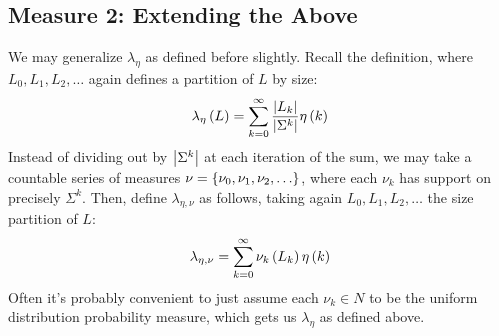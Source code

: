 \documentclass[12pt]{article}
\begin{document}
\subsection{Measure 2: Extending the Above}
We may generalize \(\lambda_{\eta}\) as defined before slightly.
Recall the definition, where
\(L_0, L_1, L_2, \ldots\) again defines a partition of \(L\) by size:
\begin{align*}
  \lambda_{\eta}\left(L\right)
    = \sum_{k = 0}^{\infty} \frac{\left\lvert L_k\right\rvert}{\left\lvert\Sigma^k\right\rvert} \eta\left(k\right)
\end{align*}
Instead of dividing out by \(\left\lvert\Sigma^k\right\rvert\) at each iteration of the sum,
we may take a countable series of measures
\(\nu = \left\{\nu_0, \nu_1, \nu_2, \ldots\right\}\),
where each \(\nu_k\) has support on precisely \(\Sigma^k\).
Then, define \(\lambda_{\eta, \nu}\) as follows,
taking again \(L_0, L_1, L_2, \ldots\) the size partition of \(L\):
\begin{align*}
  \lambda_{\eta, \nu}
    = \sum_{k = 0}^{\infty} \nu_k \left(L_k\right) \eta\left(k\right)
\end{align*}
Often it's probably convenient to just assume each \(\nu_k \in N\)
to be the uniform distribution probability measure,
which gets us \(\lambda_{\eta}\) as defined above.
\end{document}
